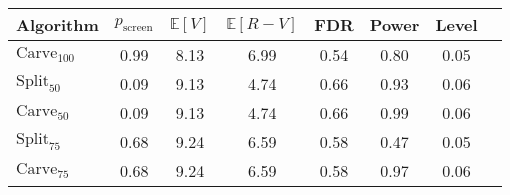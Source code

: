 \begin{tabular}{|l|c|c|c|c|c|c|c|}
\hline
            Algorithm &  $p_{\text{screen}}$ &  $\mathbb{E}[V]$ &  $\mathbb{E}[R-V]$ &  FDR &  Power &  Level \\
\hline
 $\text{Carve}_{100}$ &                 0.99 &             8.13 &               6.99 & 0.54 &   0.80 &   0.05 \\
  $\text{Split}_{50}$ &                 0.09 &             9.13 &               4.74 & 0.66 &   0.93 &   0.06 \\
  $\text{Carve}_{50}$ &                 0.09 &             9.13 &               4.74 & 0.66 &   0.99 &   0.06 \\
  $\text{Split}_{75}$ &                 0.68 &             9.24 &               6.59 & 0.58 &   0.47 &   0.05 \\
  $\text{Carve}_{75}$ &                 0.68 &             9.24 &               6.59 & 0.58 &   0.97 &   0.06 \\
\hline
\end{tabular}
